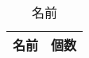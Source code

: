 \begin{table}[htbp]
  \caption{名前}
  \begin{center}
    \begin{tabular}{|c|c|}\hline
      \multicolumn{1}{|c|}{名前} & \multicolumn{1}{c|}{個数} \\ \hline
    \end{tabular}
  \end{center}
  \label{tab:ラベル}
\end{table}

